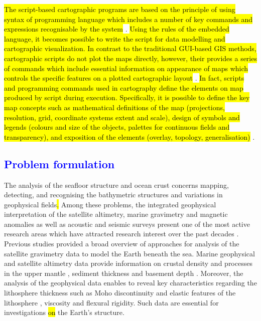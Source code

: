 \documentclass[geomatics,article,submit,pdftex,moreauthors]{Definitions/mdpi}
\begin{document}
\hl{The script-based cartographic programs are based on the principle of using syntax of programming language which includes a number of key commands and expressions recognisable by the system} \cite{6057428}. \hl{Using the rules of the embedded language, it becomes possible to write the script for data modelling and cartographic visualization. In contrast to the traditional GUI-based GIS methods, cartographic scripts do not plot the maps directly, however, their provides a series of commands which include essential information on appearance of maps which controls the specific features on a plotted cartographic layout} \cite{Lemenkova202215}. \hl{In fact, scripts and programming commands used in cartography define the elements on map produced by script during execution. Specifically, it is possible to define the key map concepts such as mathematical definitions of the map (projections, resolution, grid, coordinate systems extent and scale), design of symbols and legends (colours and size of the objects, palettes for continuous fields and transparency), and exposition of the elements (overlay, topology, generalisation)} \cite{ABER201753}.

\subsection{\textcolor{blue}{Problem formulation}}
The analysis of the seafloor structure and ocean crust concerns mapping, detecting, and recognising the bathymetric structures and variations in geophysical fields\hl{. }Among these problems, the integrated geophysical interpretation of the satellite altimetry, marine gravimetry and magnetic anomalies as well as acoustic and seismic surveys present one of the most active research areas which have attracted\hl{ }research interest over the past decades \cite{Bascou}. Previous studies \cite{ESHAGH2021313} provided a broad overview of\hl{ }approaches for analysis of the satellite gravimetry data to model the Earth beneath the sea. Marine geophysical and satellite altimetry data provide information on crustal density and processes in the upper mantle \cite{KAPAWAR2021106692,PENG2022110823,ZHANG202368}, sediment thickness and basement depth \cite{Lemenkova202005}. Moreover, the analysis of the geophysical data enables to reveal key characteristics regarding the lithosphere thickness such as Moho discontinuity and elastic features of the lithosphere \cite{TESAURO201378}, viscosity and flexural rigidity. Such data are essential for\hl{ }investigations \hl{on} the Earth's structure.
\end{document}
